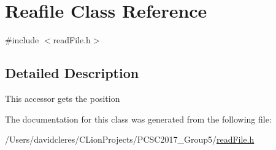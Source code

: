 \hypertarget{class_reafile}{}\section{Reafile Class Reference}
\label{class_reafile}


{\ttfamily \#include $<$read\+File.\+h$>$}



\subsection{Detailed Description}
This accessor gets the position 

The documentation for this class was generated from the following file\+:\begin{DoxyCompactItemize}
\item 
/\+Users/davidcleres/\+C\+Lion\+Projects/\+P\+C\+S\+C2017\+\_\+\+Group5/\mbox{\hyperlink{read_file_8h}{read\+File.\+h}}\end{DoxyCompactItemize}
